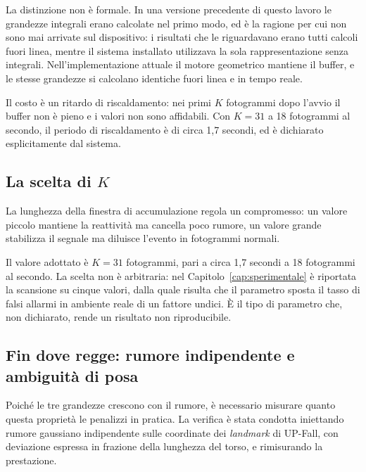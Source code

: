 La distinzione non è formale. In una versione precedente di questo lavoro le
grandezze integrali erano calcolate nel primo modo, ed è la ragione per cui non
sono mai arrivate sul dispositivo: i risultati che le riguardavano erano tutti
calcoli fuori linea, mentre il sistema installato utilizzava la sola
rappresentazione senza integrali. Nell'implementazione attuale il motore
geometrico mantiene il buffer, e le stesse grandezze si calcolano identiche
fuori linea e in tempo reale.

Il costo è un ritardo di riscaldamento: nei primi $K$ fotogrammi dopo l'avvio
il buffer non è pieno e i valori non sono affidabili. Con $K = 31$ a 18
fotogrammi al secondo, il periodo di riscaldamento è di circa 1,7 secondi, ed è
dichiarato esplicitamente dal sistema.

\subsection{La scelta di $K$}

La lunghezza della finestra di accumulazione regola un compromesso: un valore
piccolo mantiene la reattività ma cancella poco rumore, un valore grande
stabilizza il segnale ma diluisce l'evento in fotogrammi normali.

Il valore adottato è $K = 31$ fotogrammi, pari a circa 1,7 secondi a 18
fotogrammi al secondo. La scelta non è arbitraria: nel
Capitolo~\ref{cap:sperimentale} è riportata la scansione su cinque valori, dalla
quale risulta che il parametro sposta il tasso di falsi allarmi in ambiente
reale di un fattore undici. È il tipo di parametro che, non dichiarato, rende
un risultato non riproducibile.

\subsection{Fin dove regge: rumore indipendente e ambiguità di posa}
\label{sec:rumore-int}

Poiché le tre grandezze crescono con il rumore, è necessario misurare quanto
questa proprietà le penalizzi in pratica. La verifica è stata condotta
iniettando rumore gaussiano indipendente sulle coordinate dei \emph{landmark}
di UP-Fall, con deviazione espressa in frazione della lunghezza del torso, e
rimisurando la prestazione.

